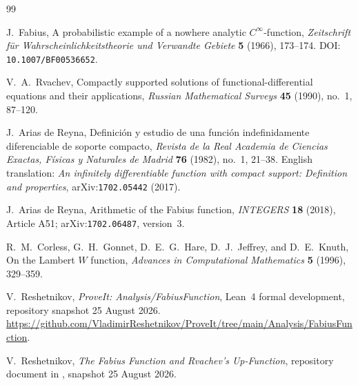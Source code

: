 \documentclass[11pt,oneside]{article}
\theoremstyle{definition}
\theoremstyle{remark}
\begin{document}
\renewcommand{\refname}{Topic references}
\begin{thebibliography}{99}

J.~Fabius,
\newblock A probabilistic example of a nowhere analytic $C^\infty$-function,
\newblock \emph{Zeitschrift f\"ur Wahrscheinlichkeitstheorie und Verwandte
Gebiete} \textbf{5} (1966), 173--174.
\newblock DOI: \nolinkurl{10.1007/BF00536652}.

V.~A.~Rvachev,
\newblock Compactly supported solutions of functional-differential equations
and their applications,
\newblock \emph{Russian Mathematical Surveys} \textbf{45} (1990), no.~1,
87--120.

J.~Arias de Reyna,
\newblock Definici\'on y estudio de una funci\'on indefinidamente
diferenciable de soporte compacto,
\newblock \emph{Revista de la Real Academia de Ciencias Exactas, F\'isicas y
Naturales de Madrid} \textbf{76} (1982), no.~1, 21--38.
\newblock English translation:
\emph{An infinitely differentiable function with compact support:
Definition and properties}, arXiv:\nolinkurl{1702.05442} (2017).

J.~Arias de Reyna,
\newblock Arithmetic of the Fabius function,
\newblock \emph{INTEGERS} \textbf{18} (2018), Article A51;
arXiv:\nolinkurl{1702.06487}, version~3.

R.~M.~Corless, G.~H.~Gonnet, D.~E.~G.~Hare, D.~J.~Jeffrey, and D.~E.~Knuth,
\newblock On the Lambert $W$ function,
\newblock \emph{Advances in Computational Mathematics}
\textbf{5} (1996), 329--359.

V.~Reshetnikov,
\newblock \emph{ProveIt: Analysis/FabiusFunction},
\newblock Lean~4 formal development, repository snapshot 25 August 2026.
\newblock
\url{https://github.com/VladimirReshetnikov/ProveIt/tree/main/Analysis/FabiusFunction}.

V.~Reshetnikov,
\newblock \emph{The Fabius Function and Rvachev's Up-Function},
\newblock repository document in
,
snapshot 25 August 2026.

\end{thebibliography}


\renewcommand{\arraystretch}{1}

\clearpage
\end{document}
